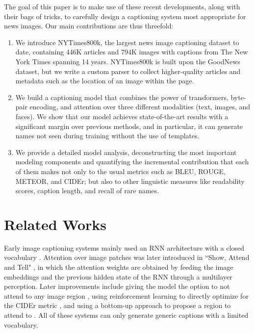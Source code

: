 \documentclass[10pt,twocolumn,letterpaper]{article}
\begin{document}
The goal of this paper is to make use of these recent developments, along with
their bags of tricks, to carefully design a captioning system most appropriate
for news images. Our main contributions are thus threefold:

\begin{enumerate}
   \item We introduce NYTimes800k, the largest news image captioning dataset to
   date, containing 446K articles and 794K images with captions from The New
   York Times spanning 14 years. NYTimes800k is built upon the GoodNews dataset,
   but we write a custom parser to collect higher-quality articles and metadata
   such as the location of an image within the page.

   \item We build a captioning model that combines the power of transformers,
   byte-pair encoding, and attention over three different modalities (text,
   images, and faces). We show that our model achieves state-of-the-art results
   with a significant margin over previous methods, and in particular, it can
   generate names not seen during training without the use of templates.

   \item We provide a detailed model analysis, deconstructing the most
   important modeling components and quantifying the incremental contribution
   that each of them makes not only to the usual metrics such as BLEU, ROUGE,
   METEOR, and CIDEr; but also to other linguistic measures like readability
   scores, caption length, and recall of rare names.
\end{enumerate}


\section{Related Works}

Early image captioning systems mainly used an RNN architecture with a closed
vocabulary \cite{Karpathy2015DeepVA, Donahue2015LongTR, Vinyals2015ShowAT}.
Attention over image patches was later introduced in ``Show, Attend and Tell"
\cite{Xu2015ShowAA}, in which the attention weights are obtained by feeding the
image embeddings and the previous hidden state of the RNN through a multilayer
perception. Later improvements include giving the model the option to not
attend to any image region \cite{Lu2017KnowingWT}, using reinforcement learning
to directly optimize for the CIDEr metric \cite{Rennie2017SelfCriticalST,
Gao2019DeliberateAN}, and using a bottom-up approach to propose a region to
attend to \cite{Anderson2017BottomUpAT}. All of these systems can only generate
generic captions with a limited vocabulary.
\end{document}
